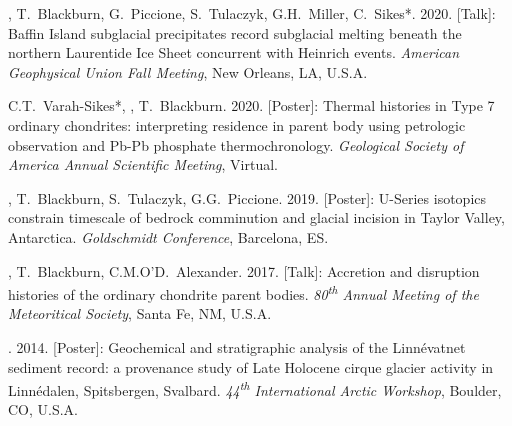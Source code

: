 \begin{etaremune} [itemsep=4pt, leftmargin=3ex]
  \item \ghedwards, T.~Blackburn, G.~Piccione, S.~Tulaczyk, G.H.~Miller, C.~Sikes*. 2020. [Talk]: Baffin Island subglacial precipitates record subglacial melting beneath the northern Laurentide Ice Sheet concurrent with Heinrich events. \textit{American Geophysical Union Fall Meeting}, New Orleans, LA, U.S.A.

  \item C.T.~Varah-Sikes*, \ghedwards, T.~Blackburn. 2020. [Poster]: Thermal histories in Type 7 ordinary chondrites: interpreting residence in parent body using petrologic observation and Pb-Pb phosphate thermochronology. \textit{Geological Society of America Annual Scientific Meeting}, Virtual.

  \item  \ghedwards, T.~Blackburn, S.~Tulaczyk, G.G.~Piccione. 2019. [Poster]: U-Series isotopics constrain timescale of bedrock comminution and glacial incision in Taylor Valley, Antarctica. \textit{Goldschmidt Conference}, Barcelona, ES.


  \item  \ghedwards, T.~Blackburn, C.M.O’D.~Alexander. 2017. [Talk]: Accretion and disruption histories of the ordinary chondrite parent bodies. \textit{80\textsuperscript{th} Annual Meeting of the Meteoritical Society}, Santa Fe, NM, U.S.A.

  \item \ghedwards. 2014. [Poster]: Geochemical and stratigraphic analysis of the Linnévatnet sediment record: a provenance study of Late Holocene cirque glacier activity in Linnédalen, Spitsbergen, Svalbard. \textit{44\textsuperscript{th} International Arctic Workshop}, Boulder, CO, U.S.A.
\end{etaremune}


 




